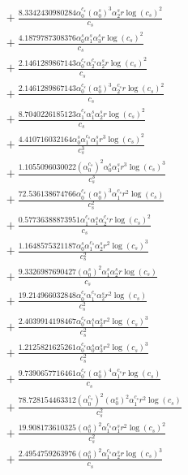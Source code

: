 \documentclass[10pt]{article}
\begin{document}
\begin{align*}
&{}  + \frac{8.3342430980284 \alpha_{0}^{c_s} \left(\alpha_{0}^s\right)^{3} \alpha_{2}^s r \log{\left(c_{s} \right)}^{2}}{c_{s}} \\
&{}  + \frac{4.1879787308376 \alpha_{0}^s \alpha_{1}^s \alpha_{3}^s r \log{\left(c_{s} \right)}^{2}}{c_{s}} \\
&{}  + \frac{2.1461289867143 \alpha_{0}^{c_s} \alpha_{2}^{c_s} \alpha_{2}^s r \log{\left(c_{s} \right)}^{2}}{c_{s}} \\
&{}  + \frac{2.1461289867143 \alpha_{0}^{c_s} \left(\alpha_{0}^s\right)^{3} \alpha_{2}^{c_s} r \log{\left(c_{s} \right)}^{2}}{c_{s}} \\
&{}  + \frac{8.7040226185123 \alpha_{1}^{c_s} \alpha_{1}^s \alpha_{2}^s r \log{\left(c_{s} \right)}^{2}}{c_{s}} \\
&{}  + \frac{4.410716032164 \alpha_{0}^s \alpha_{1}^{c_s} \alpha_{1}^s r^{3} \log{\left(c_{s} \right)}^{2}}{c_{s}^{3}} \\
&{}  + \frac{1.1055096030022 \left(\alpha_{0}^{c_s}\right)^{2} \alpha_{0}^s \alpha_{1}^s r^{3} \log{\left(c_{s} \right)}^{3}}{c_{s}^{3}} \\
&{}  + \frac{72.536138674766 \alpha_{0}^{c_s} \left(\alpha_{0}^s\right)^{3} \alpha_{1}^{c_s} r^{2} \log{\left(c_{s} \right)}}{c_{s}^{2}} \\
&{}  + \frac{0.57736388873951 \alpha_{1}^{c_s} \alpha_{1}^s \alpha_{2}^{c_s} r \log{\left(c_{s} \right)}^{2}}{c_{s}} \\
&{}  + \frac{1.1648575321187 \alpha_{0}^s \alpha_{1}^{c_s} \alpha_{2}^s r^{2} \log{\left(c_{s} \right)}^{3}}{c_{s}^{2}} \\
&{}  + \frac{9.3326987690427 \left(\alpha_{0}^s\right)^{2} \alpha_{1}^s \alpha_{2}^s r \log{\left(c_{s} \right)}}{c_{s}} \\
&{}  + \frac{19.214966032848 \alpha_{0}^{c_s} \alpha_{1}^{c_s} \alpha_{2}^s r^{2} \log{\left(c_{s} \right)}}{c_{s}^{2}} \\
&{}  + \frac{2.4039914198467 \alpha_{0}^{c_s} \alpha_{1}^s \alpha_{2}^s r^{2} \log{\left(c_{s} \right)}^{3}}{c_{s}^{2}} \\
&{}  + \frac{1.2125821625261 \alpha_{0}^{c_s} \alpha_{0}^s \alpha_{3}^s r^{2} \log{\left(c_{s} \right)}^{3}}{c_{s}^{2}} \\
&{}  + \frac{9.7390657716461 \alpha_{0}^{c_s} \left(\alpha_{0}^s\right)^{4} \alpha_{1}^{c_s} r \log{\left(c_{s} \right)}}{c_{s}} \\
&{}  + \frac{78.728154463312 \left(\alpha_{0}^{c_s}\right)^{2} \left(\alpha_{0}^s\right)^{2} \alpha_{1}^{c_s} r^{2} \log{\left(c_{s} \right)}}{c_{s}^{2}} \\
&{}  + \frac{19.908173610325 \left(\alpha_{0}^s\right)^{2} \alpha_{1}^{c_s} \alpha_{1}^s r^{2} \log{\left(c_{s} \right)}^{2}}{c_{s}^{2}} \\
&{}  + \frac{2.4954759263976 \left(\alpha_{0}^s\right)^{2} \alpha_{1}^{c_s} \alpha_{2}^s r \log{\left(c_{s} \right)}^{3}}{c_{s}}
\end{align*}
\end{document}
